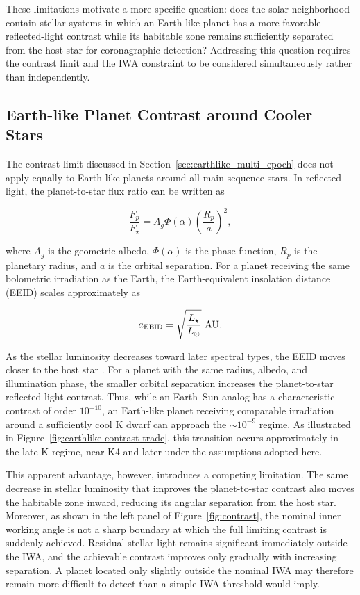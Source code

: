 These limitations motivate a more specific question: does the solar
neighborhood contain stellar systems in which an Earth-like planet has a more
favorable reflected-light contrast while its habitable zone remains
sufficiently separated from the host star for coronagraphic detection?
Addressing this question requires the contrast limit and the IWA constraint to
be considered simultaneously rather than independently.


\subsection{Earth-like Planet Contrast around Cooler Stars}
\label{sec:earthlike_contrast}

The contrast limit discussed in Section~\ref{sec:earthlike_multi_epoch} does not apply equally to Earth-like planets around all main-sequence stars. In reflected light, the planet-to-star flux ratio can be written as \cite{traub10}

\begin{equation}
\frac{F_p}{F_\star}
=
A_g \Phi(\alpha)
\left(\frac{R_p}{a}\right)^2 ,
\label{eq:reflected_contrast}
\end{equation}

where $A_g$ is the geometric albedo, $\Phi(\alpha)$ is the phase function,
$R_p$ is the planetary radius, and $a$ is the orbital separation. For a
planet receiving the same bolometric irradiation as the Earth, the
Earth-equivalent insolation distance (EEID) scales approximately as \cite{kopparapu13,kopparapu14}

\begin{equation}
a_{\rm EEID}
=
\sqrt{\frac{L_\star}{L_\odot}}\ {\rm AU}.
\label{eq:eeid}
\end{equation}

As the stellar luminosity decreases toward later spectral types, the EEID
moves closer to the host star \cite{kopparapu13}. For a planet with the same radius, 
albedo, and illumination phase, the smaller orbital separation increases the
planet-to-star reflected-light contrast. Thus, while an Earth--Sun analog has
a characteristic contrast of order $10^{-10}$, an Earth-like planet receiving
comparable irradiation around a sufficiently cool K dwarf can approach the
$\sim10^{-9}$ regime. As illustrated in Figure~\ref{fig:earthlike-contrast-trade}, 
this transition occurs approximately in the late-K regime, near K4 and later
under the assumptions adopted here.

This apparent advantage, however, introduces a competing limitation. The same
decrease in stellar luminosity that improves the planet-to-star contrast also
moves the habitable zone inward, reducing its angular separation from the
host star. Moreover, as shown in the left panel of Figure~\ref{fig:contrast}, 
the nominal inner working angle is not a sharp boundary at which the full limiting
contrast is suddenly achieved. Residual stellar light remains significant
immediately outside the IWA, and the achievable contrast improves only
gradually with increasing separation. A planet located only slightly outside
the nominal IWA may therefore remain more difficult to detect than a simple
IWA threshold would imply.

